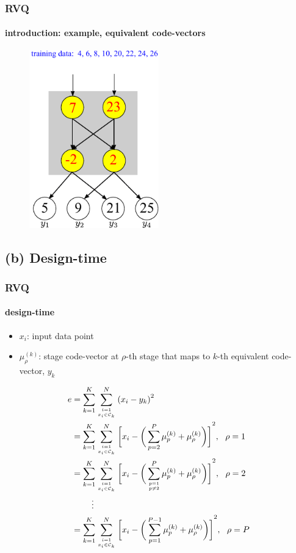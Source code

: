 \begin{frame}
\frametitle{RVQ}
\framesubtitle{introduction: example, equivalent code-vectors}
\mypagenum
\begin{figure}[t]
\centering
\includegraphics[width=0.5\textwidth]{thesis/RVQ_introduction.pdf}
\end{figure}
\end{frame}


\subsection{(b) Design-time}
\begin{frame}
\frametitle{RVQ}
\framesubtitle{design-time}
\mypagenum
\begin{itemize}
\item $x_i$: input data point
\item $\mu_\rho^{(k)}$: stage code-vector at $\rho$-th stage that maps to $k$-th equivalent code-vector, $y_k$
\end{itemize}
\scriptsize
\begin{align}
e &= \KmeansError\notag\\
&= \KmeansSum{\bigg[\RVQmultipleKmeansone\bigg]}^2, \ \ \rho=1\notag\\
&= \KmeansSum{\bigg[\RVQmultipleKmeanstwo\bigg]}^2, \ \ \rho=2\notag\\
&\ \ \ \  \ \ \ \vdots\notag\\
&=\KmeansSum{\bigg[\RVQmultipleKmeansT\bigg]}^2, \ \ \rho=P\notag
\end{align}
\end{frame}



